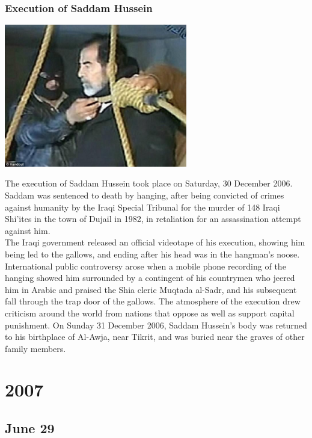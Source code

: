 \documentclass[11pt]{report}
\begin{document}
\subsection{Execution of Saddam Hussein}
\vspace{2mm}\begin{center}\includegraphics[width=8cm]{./img/saddamhusseinexec.jpg}\end{center}
The execution of Saddam Hussein took place on Saturday, 30 December 2006. Saddam was sentenced to death by hanging, after being convicted of crimes against humanity by the Iraqi Special Tribunal for the murder of 148 Iraqi Shi'ites in the town of Dujail in 1982, in retaliation for an assassination attempt against him.\\
\indent The Iraqi government released an official videotape of his execution, showing him being led to the gallows, and ending after his head was in the hangman's noose. International public controversy arose when a mobile phone recording of the hanging showed him surrounded by a contingent of his countrymen who jeered him in Arabic and praised the Shia cleric Muqtada al-Sadr, and his subsequent fall through the trap door of the gallows. The atmosphere of the execution drew criticism around the world from nations that oppose as well as support capital punishment. On Sunday 31 December 2006, Saddam Hussein's body was returned to his birthplace of Al-Awja, near Tikrit, and was buried near the graves of other family members.

\chapter{2007}
\section{June 29}
\end{document}

